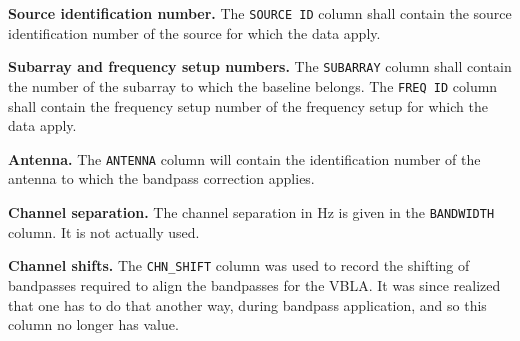 \documentclass[twoside]{article}
\begin{document}
{\bf Source identification number.}  The {\tt SOURCE ID} column shall
contain the source identification number of the source for which the
data apply.

{\bf Subarray  and frequency setup numbers.} The {\tt SUBARRAY} column
shall contain the number of the subarray to which the baseline belongs.
The {\tt FREQ ID} column shall contain the frequency setup number of
the frequency setup for which the data apply.

{\bf Antenna.} The {\tt ANTENNA} column will contain the
identification number of the antenna to which the bandpass correction
applies.

{\bf Channel separation.} The channel separation in Hz is given in the
{\tt BANDWIDTH} column.  It is not actually used.

{\bf Channel shifts.} The {\tt CHN\_SHIFT} column was used to record
the shifting of bandpasses required to align the bandpasses for the
VBLA\@.  It was since realized that one has to do that another way,
during bandpass application, and so this column no longer has value.
\vfill\eject
\end{document}
